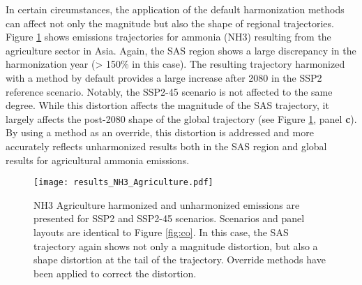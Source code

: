 In certain circumstances, the application of the default harmonization methods
can affect not only the magnitude but also the shape of regional
trajectories. Figure \ref{fig:nh3} shows emissions trajectories for ammonia
(NH3) resulting from the agriculture sector in Asia. Again, the SAS region shows
a large discrepancy in the harmonization year (> 150\% in this case). The
resulting trajectory harmonized with a  method by default
provides a large increase after 2080 in the SSP2 reference scenario. Notably,
the SSP2-45 scenario is not affected to the same degree. While this distortion
affects the magnitude of the SAS trajectory, it largely affects the post-2080
shape of the global trajectory (see Figure \ref{fig:nh3}, panel \textbf{c}). By
using a  method as an override, this distortion is
addressed and more accurately reflects unharmonized results both in the SAS
region and global results for agricultural ammonia emissions.

\begin{figure}
  \begin{center}
    \texttt{[image: results\_NH3\_Agriculture.pdf]}
    \caption[]{
      \label{fig:nh3}
      NH3 Agriculture harmonized and unharmonized emissions are presented for
      SSP2 and SSP2-45 scenarios. Scenarios and panel layouts are identical to
      Figure \ref{fig:co}. In this case, the SAS trajectory again shows not only
      a magnitude distortion, but also a shape distortion at the tail of the
      trajectory. Override methods have been applied to correct the distortion.
    }
  \end{center}
\end{figure}




